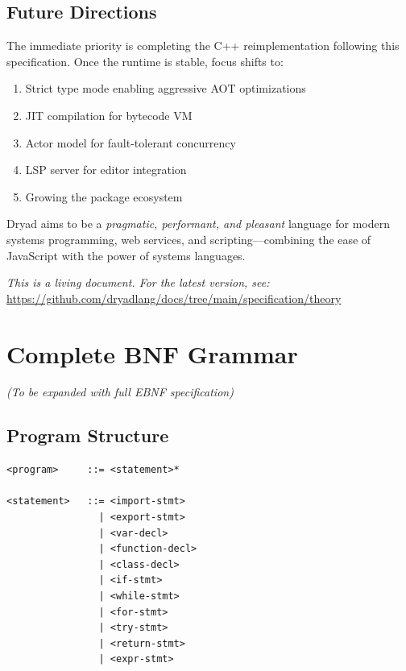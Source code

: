 \documentclass[12pt,a4paper]{article}
\theoremstyle{definition}
\begin{document}
\subsection{Future Directions}

The immediate priority is completing the C++ reimplementation following this specification. Once the runtime is stable, focus shifts to:
\begin{enumerate}[leftmargin=*]
    \item Strict type mode enabling aggressive AOT optimizations
    \item JIT compilation for bytecode VM
    \item Actor model for fault-tolerant concurrency
    \item LSP server for editor integration
    \item Growing the package ecosystem
\end{enumerate}

Dryad aims to be a \textit{pragmatic, performant, and pleasant} language for modern systems programming, web services, and scripting—combining the ease of JavaScript with the power of systems languages.

\vspace{1cm}

\begin{center}
\textit{This is a living document. For the latest version, see:}\\
\url{https://github.com/dryadlang/docs/tree/main/specification/theory}
\end{center}

\newpage

\appendix

\section{Complete BNF Grammar}

\textit{(To be expanded with full EBNF specification)}

\subsection{Program Structure}

\begin{verbatim}
<program>     ::= <statement>*

<statement>   ::= <import-stmt>
                | <export-stmt>
                | <var-decl>
                | <function-decl>
                | <class-decl>
                | <if-stmt>
                | <while-stmt>
                | <for-stmt>
                | <try-stmt>
                | <return-stmt>
                | <expr-stmt>
\end{verbatim}
\end{document}
